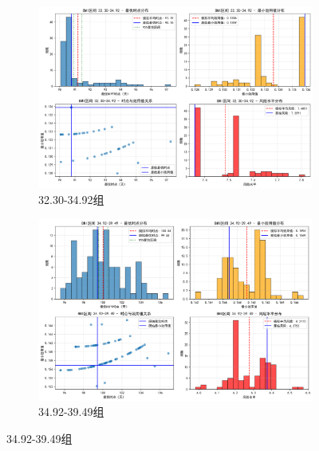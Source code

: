 \documentclass{article}
\begin{document}
\begin{figure}[H]
    \centering
    \begin{subfigure}[b]{0.35\textwidth}  %
        \centering
        \includegraphics[width=\textwidth]{graph/error_analysis_BMI_32.30-34.92.png}  %
        \caption{32.30-34.92组}  %
        \label{fig:sub1}  %
    \end{subfigure}
    \hspace{0.05\textwidth}  %
    \begin{subfigure}[b]{0.35\textwidth}
        \centering
        \includegraphics[width=\textwidth]{graph/error_analysis_BMI_34.92-39.49.png}
        \caption{34.92-39.49组}
        \label{fig:sub2}
    \end{subfigure}
    \label{fig:two}  %
\end{figure}
\end{document}
